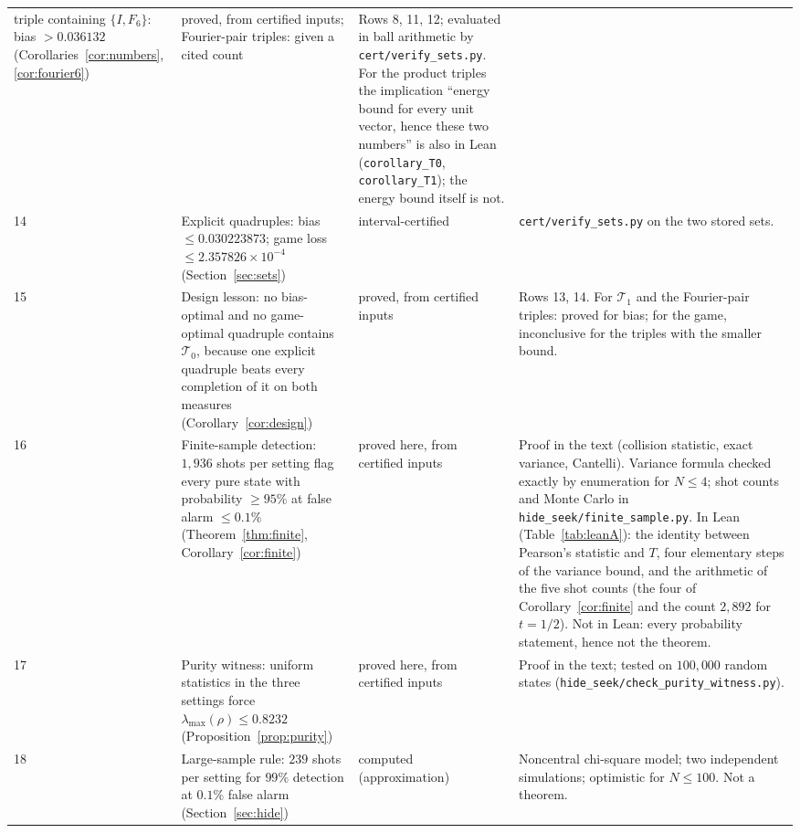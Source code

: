 \documentclass[11pt]{article}
\newcommand{\Tz}{\mathcal{T}_0}          %
\newcommand{\To}{\mathcal{T}_1}          %
\theoremstyle{definition}
\theoremstyle{remark}
\begin{document}
{\begin{longtable}{@{}p{}>{\raggedright\arraybackslash}p{}>{\raggedright\arraybackslash}p{}>{\raggedright\arraybackslash}p{}@{}}
  triple containing $\{I,F_6\}$: bias $>0.036132$ (Corollaries~\ref{cor:numbers}, \ref{cor:fourier6}) & proved,
  from certified inputs; Fourier-pair triples: given a cited count & Rows 8, 11, 12; evaluated in ball arithmetic by \texttt{cert/}\allowbreak\texttt{verify\_sets.py}. For
  the product triples the implication ``energy bound for every unit vector, hence these two numbers'' is also in
  Lean (\texttt{corollary\_T0}, \texttt{corollary\_T1}); the energy bound itself is not.\\
14 & Explicit quadruples: bias $\le0.030223873$; game loss $\le2.357826\times10^{-4}$
  (Section~\ref{sec:sets}) & interval-certified & \texttt{cert/}\allowbreak\texttt{verify\_sets.py} on the two stored sets.\\
15 & Design lesson: no bias-optimal and no game-optimal quadruple contains $\Tz$, because one explicit
  quadruple beats every completion of it on both measures (Corollary~\ref{cor:design}) & proved, from certified inputs & Rows 13, 14. For $\To$ and the Fourier-pair
  triples: proved for bias; for the game, inconclusive for the triples with the smaller bound.\\
16 & Finite-sample detection: $1{,}936$ shots per setting flag every pure state with probability $\ge95\%$ at
  false alarm $\le0.1\%$ (Theorem~\ref{thm:finite}, Corollary~\ref{cor:finite}) & proved here, from certified
  inputs & Proof in the text (collision statistic, exact variance, Cantelli). Variance formula checked exactly
  by enumeration for $N\le4$; shot counts and Monte Carlo in \texttt{hide\_seek/}\allowbreak\texttt{finite\_sample.py}. In
  Lean (Table~\ref{tab:leanA}): the identity between Pearson's statistic and $T$, four elementary steps of the
  variance bound, and the arithmetic of the five shot counts (the four of Corollary~\ref{cor:finite} and the count $2{,}892$ for $t=1/2$). Not in Lean: every probability statement, hence not
  the theorem.\\
17 & Purity witness: uniform statistics in the three settings force $\lambda_{\max}(\rho)\le0.8232$
  (Proposition~\ref{prop:purity}) & proved here, from certified inputs & Proof in the text; tested on
  $100{,}000$ random states (\texttt{hide\_seek/}\allowbreak\texttt{check\_purity\_witness.py}).\\
18 & Large-sample rule: $239$ shots per setting for $99\%$ detection at $0.1\%$ false alarm
  (Section~\ref{sec:hide}) & computed (approximation) & Noncentral chi-square model; two independent
  simulations; optimistic for $N\le100$. Not a theorem.\\

\end{longtable}}
\end{document}
